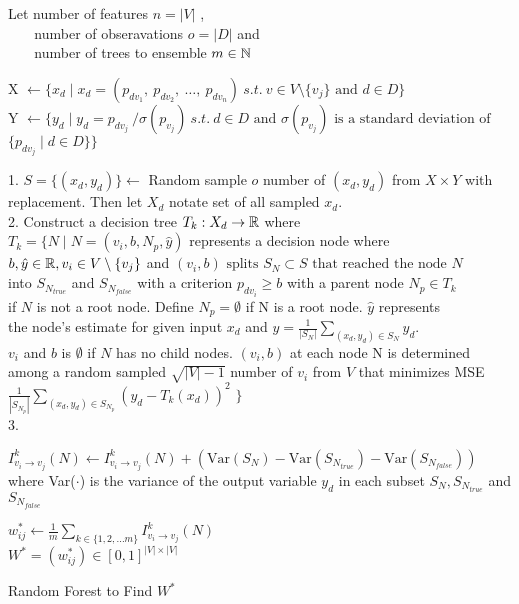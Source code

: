 \begin{algorithm}[H]
    \DontPrintSemicolon
    \SetAlgoLined

    Let number of features $n = |V|$ , \\
    $\:\:\:\:\:\:\:$ number of obseravations $o = |D|$ and \\
    $\:\:\:\:\:\:\:$ number of trees to ensemble $ m \in \Bbb N$

     {
    X $\gets \{ x_d \mid x_d = (p_{dv_1},\: p_{dv_2},\: \ldots, \:p_{dv_{n}}) \: s.t. \: v \in V \setminus{\{v_j\}} \text{ and } d \in D \} \:$  \\
    Y $\gets \{ y_d  \mid y_d = p_{dv_j} \: / \sigma(p_{v_j}) \: s.t. \: d \in D \text{ and } \sigma(p_{v_j}) \text{ is a standard deviation of }$ \\
    $\{ p_{dv_j} \mid d \in D \} \}$\\

     {
    1. $S = \{(x_d, y_d)\} \gets $ Random sample $o$ number of $(x_d, y_d)$ from $X \times Y$ with replacement. Then let $X_d$ notate set of all sampled $x_d$. \\
    2. Construct a decision tree $T_k: X_d \to \Bbb R$ where\\
    $T_k = \{ N \mid N = (v_i, b, N_p, \hat{y}) $ represents a decision node where \\
    $ b, \hat{y} \in \Bbb R, v_i \in V \setminus{\{v_j\}} $ and $(v_i, b) \text{ splits } S_N \subset S \text{ that reached the node } N $\\
    into $S_{N_{true}}$ and $S_{N_{false}}$ with a criterion $p_{dv_i} \ge b$ with a parent node $ N_p \in T_k$ \\             if $N$ is not a root node. Define $N_p = \emptyset$ if N is a root node. $\hat{y}$ represents \\
    the node's estimate for given input $x_d$ and $\hat{y} = \frac{1}{|S_N|}\sum_{(x_d, y_d) \in S_N}y_d$.\\
    $v_i$ and $b$ is $\emptyset$ if $N$ has no child nodes.
    $(v_i, b)$ at each node N is determined \\ among a random sampled $\sqrt{|V|-1}$ number of $v_i$ from $V$ that minimizes MSE $\frac{1}{|S_{N_p}|}\sum_{(x_d, y_d) \in S_{N_p}}(y_d - T_k(x_d))^2$ $\}$\\
    3.
     {
    {
    $I^k_{v_i \to v_j}(N) \gets I^k_{v_i \to v_j}(N) + (\text{Var}(S_N) - \text{Var}(S_{N_{true}}) - \text{Var}(S_{N_{false}}))$ where Var($\cdot$) is the variance
    of the output variable $y_d$ in each subset $S_N, S_{N_{true}}$ and $S_{N_{false}}$
    }

    }

    }
    }
     $w^*_{ij} \gets \frac{1}{m}\sum_{k \in \{ 1, 2, ... m\}} I^k_{v_i \to v_j}(N)$ \\
     $W^* = (w^*_{ij}) \in [0,1]^{|V| \times |V|}$
    \caption{Random Forest to Find $W^*$}
    \label{rf}
\end{algorithm}